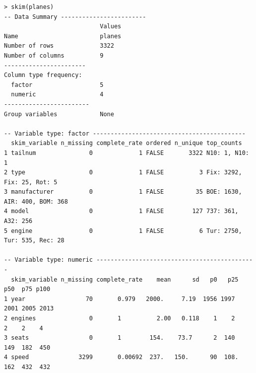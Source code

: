 \documentclass[12pt]{article}
\begin{document}
\begin{Verbatim}[fontsize=\small]
> skim(planes)
-- Data Summary ------------------------
                           Values
Name                       planes
Number of rows             3322  
Number of columns          9     
-----------------------          
Column type frequency:           
  factor                   5     
  numeric                  4     
------------------------         
Group variables            None  

-- Variable type: factor -------------------------------------------
  skim_variable n_missing complete_rate ordered n_unique top_counts                             
1 tailnum               0             1 FALSE       3322 N10: 1, N10: 1      
2 type                  0             1 FALSE          3 Fix: 3292, Fix: 25, Rot: 5             
3 manufacturer          0             1 FALSE         35 BOE: 1630, AIR: 400, BOM: 368
4 model                 0             1 FALSE        127 737: 361, A32: 256
5 engine                0             1 FALSE          6 Tur: 2750, Tur: 535, Rec: 28

-- Variable type: numeric ---------------------------------------------
  skim_variable n_missing complete_rate    mean      sd   p0   p25  p50  p75 p100  
1 year                 70       0.979   2000.     7.19  1956 1997  2001 2005 2013 
2 engines               0       1          2.00   0.118    1    2     2    2    4 
3 seats                 0       1        154.    73.7      2  140   149  182  450 
4 speed              3299       0.00692  237.   150.      90  108.  162  432  432 
\end{Verbatim}
\end{document}
